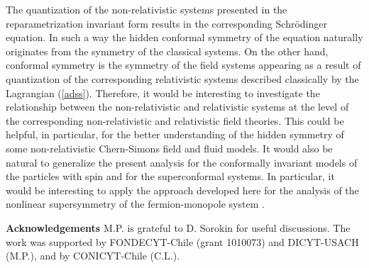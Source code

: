 \documentclass[a4paper,12pt]{article}
\begin{document}
The quantization of the non-relativistic
systems presented in the reparametrization invariant
form results in the corresponding
Schr\"odinger equation.
In such a way the hidden conformal
symmetry of the equation
naturally originates
from the \coordHE{} symmetry
of the classical systems.
On the other hand,
conformal symmetry is
the symmetry of the
field systems appearing as a result
of quantization of the corresponding
relativistic systems described classically
by the Lagrangian (\ref{adss}).
Therefore, it would be interesting
to investigate the relationship
between the non-relativistic and relativistic
systems at the level of the corresponding
non-relativistic and relativistic field theories.
This could be helpful, in particular,
for the better understanding of the
hidden \coordHE{} symmetry of
some non-relativistic Chern-Simons field
\cite{conF1,conF2,dhp} and fluid \cite{hh,OR} models.
It would also be natural
to generalize the present analysis
for the conformally invariant models
of the particles with spin and
for the superconformal systems.
In particular, it would be interesting
to apply the approach developed here for the
analysis of the nonlinear supersymmetry
of the fermion-monopole system \cite{fm}.

\vskip 0.5cm
{\bf Acknowledgements}
\vskip 5mm
M.P. is grateful to D. Sorokin for useful discussions.
The work was supported by
FONDECYT-Chile (grant 1010073) and DICYT-USACH (M.P.),
and by CONICYT-Chile (C.L.).
\end{document}
